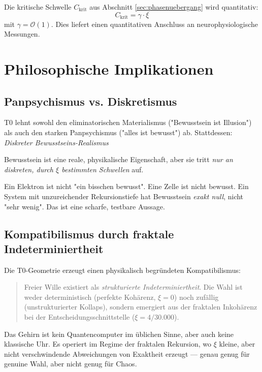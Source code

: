 \documentclass[11pt,a4paper]{article}
\begin{document}
	Die kritische Schwelle \(C_{\text{krit}}\) aus Abschnitt \ref{sec:phasenuebergang} wird quantitativ:
	\[
	C_{\text{krit}} = \gamma \cdot \xi
	\]
	mit \(\gamma = \mathcal{O}(1)\). Dies liefert einen quantitativen Anschluss an neurophysiologische Messungen.
	
	\section{Philosophische Implikationen}
	\label{sec:philosophie}
	
	\subsection{Panpsychismus vs. Diskretismus}
	
	T0 lehnt sowohl den eliminatorischen Materialismus ("Bewusstsein ist Illusion") als auch den starken Panpsychismus ("alles ist bewusst") ab. Stattdessen: \emph{Diskreter Bewusstseins-Realismus}
	
	\begin{important}
		Bewusstsein ist eine reale, physikalische Eigenschaft, aber sie tritt \emph{nur an diskreten, durch \(\xi\) bestimmten Schwellen} auf.
		
		Ein Elektron ist nicht "ein bisschen bewusst". Eine Zelle ist nicht bewusst. Ein System mit unzureichender Rekursionstiefe hat Bewusstsein \emph{exakt null}, nicht "sehr wenig". Das ist eine scharfe, testbare Aussage.
	\end{important}
	
	\subsection{Kompatibilismus durch fraktale Indeterminiertheit}
	
	Die T0-Geometrie erzeugt einen physikalisch begründeten Kompatibilismus:
	
	\begin{quote}
		Freier Wille existiert als \emph{strukturierte Indeterminiertheit}. Die Wahl ist weder deterministisch (perfekte Kohärenz, \(\xi = 0\)) noch zufällig (unstrukturierter Kollaps), sondern emergiert aus der fraktalen Inkohärenz bei der Entscheidungsschnittstelle (\(\xi = 4/30.000\)).
	\end{quote}
	
	Das Gehirn ist kein Quantencomputer im üblichen Sinne, aber auch keine klassische Uhr. Es operiert im Regime der fraktalen Rekursion, wo \(\xi\) kleine, aber nicht verschwindende Abweichungen von Exaktheit erzeugt — genau genug für genuine Wahl, aber nicht genug für Chaos.
	
\end{document}
